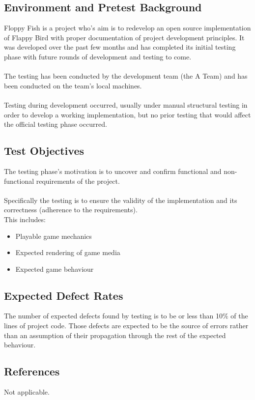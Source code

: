 \documentclass[11pt, oneside]{article}   	%
\begin{document}
\subsection{Environment and Pretest Background}
Floppy Fish is a project who's aim is to redevelop an open source implementation of Flappy Bird with proper documentation of project development principles. It was developed over the past few months and has completed its initial testing phase with future rounds of development and testing to come.\\
\\
The testing has been conducted by the development team (the A Team) and has been conducted on the team's local machines.\\
\\
Testing during development occurred, usually under manual structural testing in order to develop a working implementation, but no prior testing that would affect the official testing phase occurred.

\subsection{Test Objectives}
The testing phase's motivation is to uncover and confirm functional and non-functional requirements of the project.\\
\\
Specifically the testing is to ensure the validity of the implementation and its correctness (adherence to the requirements).\\
This includes:\\
\begin{itemize}
\item Playable game mechanics
\item Expected rendering of game media
\item Expected game behaviour
\end{itemize}

\subsection{Expected Defect Rates}
The number of expected defects found by testing is to be or less than 10\% of the lines of project code. Those defects are expected to be the source of errors rather than an assumption of their propagation through the rest of the expected behaviour.

\subsection{References}
Not applicable.
\end{document}

